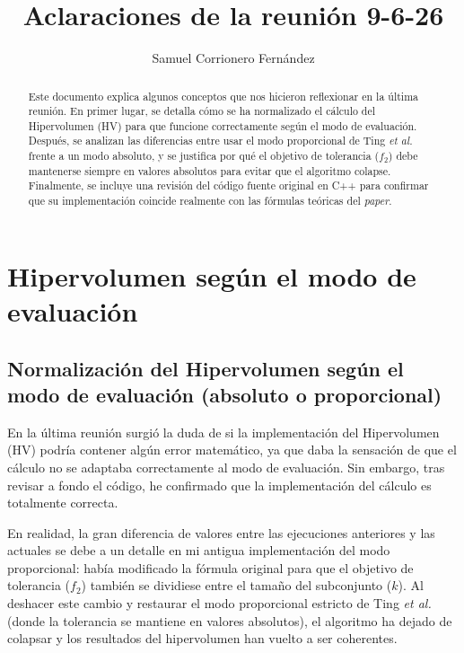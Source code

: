 \documentclass[11pt,a4paper]{article}
\title{Aclaraciones de la reunión 9-6-26}
\author{Samuel Corrionero Fernández}
\date{}
\begin{document}
\maketitle

\begin{abstract}
Este documento explica algunos conceptos que nos hicieron reflexionar en la última reunión. En primer lugar, se detalla cómo se ha normalizado el cálculo del Hipervolumen (HV) para que funcione correctamente según el modo de evaluación. Después, se analizan las diferencias entre usar el modo proporcional de Ting \textit{et al.} frente a un modo absoluto, y se justifica por qué el objetivo de tolerancia ($f_2$) debe mantenerse siempre en valores absolutos para evitar que el algoritmo colapse. Finalmente, se incluye una revisión del código fuente original en C++ para confirmar que su implementación coincide realmente con las fórmulas teóricas del \textit{paper}.
\end{abstract}

\tableofcontents
\newpage

\section{Hipervolumen según el modo de evaluación}

\subsection{Normalización del Hipervolumen según el modo de evaluación (absoluto o proporcional)}

En la última reunión surgió la duda de si la implementación del Hipervolumen (HV) podría contener algún error matemático, ya que daba la sensación de que el cálculo no se adaptaba correctamente al modo de evaluación. Sin embargo, tras revisar a fondo el código, he confirmado que la implementación del cálculo es totalmente correcta. 

En realidad, la gran diferencia de valores entre las ejecuciones anteriores y las actuales se debe a un detalle en mi antigua implementación del modo proporcional: había modificado la fórmula original para que el objetivo de tolerancia ($f_2$) también se dividiese entre el tamaño del subconjunto ($k$). Al deshacer este cambio y restaurar el modo proporcional estricto de Ting \textit{et al.} (donde la tolerancia se mantiene en valores absolutos), el algoritmo ha dejado de colapsar y los resultados del hipervolumen han vuelto a ser coherentes. 
\end{document}
